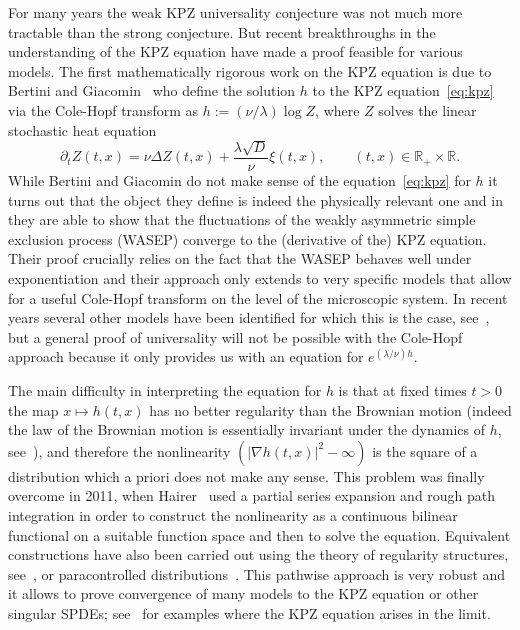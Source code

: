\documentclass[11pt, a4paper]{article}
\newcommand{\assign}{:=}
\newcommand{\R}{\mathbb{R}}
\newcommand{\1}{\mathbf{1}}
\begin{document}
For many years the weak KPZ universality conjecture was not much more tractable than the strong conjecture. But recent breakthroughs in the understanding of the KPZ equation have made a proof feasible for various models. The first mathematically rigorous work on the KPZ equation is due to Bertini and Giacomin~\cite{bib:bertiniGiacomin} who define the solution $h$ to the KPZ equation~\eqref{eq:kpz}
via the Cole-Hopf transform as $h\assign (\nu / \lambda) \log Z$, where $Z$ solves the linear stochastic heat equation
\[
   \partial_t Z(t,x) = \nu \Delta Z(t,x) + \frac{\lambda \sqrt{D}}{\nu} \xi(t,x), \qquad (t,x) \in \R_+ \times \R.
\]
While Bertini and Giacomin do not make sense of the equation~\eqref{eq:kpz} for $h$ it turns out that the object they define is indeed the physically relevant one and in~\cite{bib:bertiniGiacomin} they are able to show that the fluctuations of the weakly asymmetric simple exclusion process (WASEP) converge to the (derivative of the) KPZ equation. Their proof crucially relies on the fact that the WASEP behaves well under exponentiation and their approach only extends  to very specific models that allow for a useful Cole-Hopf transform on the level of the microscopic system. In recent years several other models have been identified for which this is the case, see~\cite{bib:demboTsai, bib:corwinTsai, bib:corwinShenTsai, bib:labbe}, but a general proof of universality will not be possible with the Cole-Hopf approach because it only provides us with an equation for $e^{(\lambda/\nu)h}$.

The main difficulty in interpreting the equation for $h$ is that at fixed times $t>0$ the map $x \mapsto h(t,x)$ has no better regularity than the Brownian motion (indeed the law of the Brownian motion is essentially invariant under the dynamics of $h$, see~\cite{bib:funakiQuastel}), and therefore the nonlinearity $(|\nabla h(t,x)|^2 - \infty)$ is the square of a distribution which a priori does not make any sense. This problem was finally overcome in 2011, when Hairer~\cite{bib:hairerKPZ} used a partial series expansion and rough path integration in order to construct the nonlinearity as a continuous bilinear functional on a suitable function space and then to solve the equation. Equivalent constructions have also been carried out using the theory of regularity structures, see~\cite{bib:hairerRegularity, bib:frizHairer}, or paracontrolled distributions~\cite{bib:paracontrolled, bib:kpzReloaded}. This pathwise approach is very robust and it allows to prove convergence of many models to the KPZ equation or other singular SPDEs; see~\cite{bib:hairerQuastel, bib:hairerShen, bib:kpzReloaded, bib:hoshino} for examples where the KPZ equation arises in the limit.%
\end{document}
